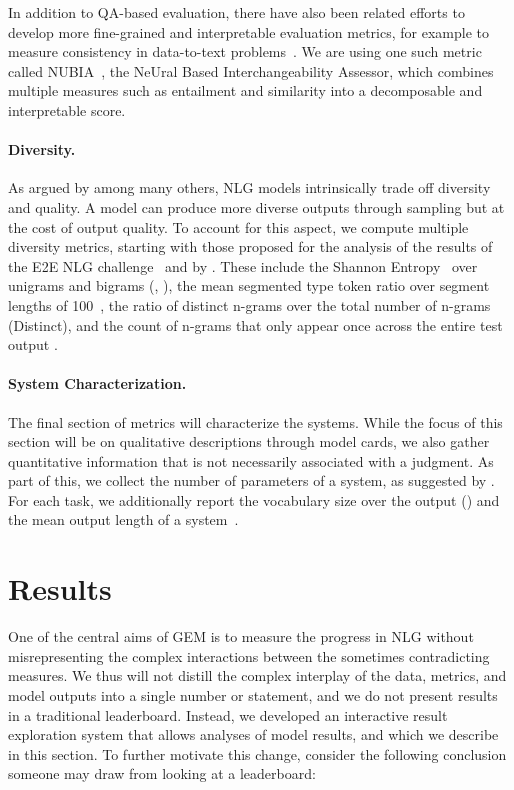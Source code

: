\documentclass[11pt,a4paper]{article}
\newcommand{\GEM}{\textsc{GEM}}
\begin{document}
In addition to QA-based evaluation, there have also been related efforts to develop more fine-grained and interpretable evaluation metrics, for example to measure consistency in data-to-text problems~\citep{opitz2020towards,dhingra2019handling}. We are using one such metric called NUBIA~\citep{kane-etal-2020-nubia}, the NeUral Based Interchangeability Assessor, which combines multiple measures such as entailment and similarity into a decomposable and interpretable score. 


\paragraph{Diversity.} As argued by \citet{hashimoto2019unifying} among many others, NLG models intrinsically trade off diversity and quality. A model can produce more diverse outputs through sampling but at the cost of output quality. To account for this aspect, we compute multiple diversity metrics, starting with those proposed for the analysis of the results of the E2E NLG challenge~\citep{duvsek2020evaluating} and by \citet{vanmiltenburg2018measuring}. These include the Shannon Entropy~\citep{shannon2001mathematical} over unigrams and bigrams (, ), the mean segmented type token ratio over segment lengths of 100~\citep[MSTTR,][]{johnson1944studies}, the ratio of distinct n-grams over the total number of n-grams (Distinct), and the count of n-grams that only appear once across the entire test output \citep[Unique,][]{li2016diversity}. 

\paragraph{System Characterization.} The final section of metrics will characterize the systems. While the focus of this section will be on qualitative descriptions through model cards, we also gather quantitative information that is not necessarily associated with a judgment. As part of this, we collect the number of parameters of a system, as suggested by \citet{ethayarajh2020utility}. For each task, we additionally report the vocabulary size over the output () and the mean output length of a system~\citep{sun2019compare}.

\section{Results}

One of the central aims of \GEM{} is to measure the progress in NLG without misrepresenting the complex interactions between the sometimes contradicting measures. We thus will not distill the complex interplay of the data, metrics, and model outputs into a single number or statement, and we do not present results in a traditional leaderboard. Instead, we developed an interactive result exploration system that allows analyses of model results, and which we describe in this section. To further motivate this change, consider the following conclusion someone may draw from looking at a leaderboard:
\end{document}
